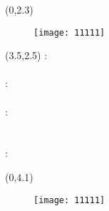 \documentclass[14pt,a4paper]{report}  %
\begin{document}
	{\begin{textblock}{6}(0,2.3)
	\begin{figure}
	\texttt{[image: 11111]}  %
    \end{figure}
    \end{textblock}}
    {\renewcommand\baselinestretch{0.99}
    \selectfont %
    {\begin{textblock}{15}(3.5,2.5) %
\noindent\fontsize{14pt}{0em}\selectfont {}\enspace:\enspace
\fontsize{14pt}{0em}\selectfont {}\\ 
\hspace*{\fill} \\
\fontsize{14pt}{0em}\selectfont {}\enspace:\enspace
\noindent\fontsize{14pt}{0em}\selectfont {} \\ 
\hspace*{\fill} \\
\fontsize{14pt}{0em}\selectfont {}\enspace:\enspace
\fontsize{14pt}{0em}\selectfont {}\\
\fontsize{14pt}{0em}\selectfont \makebox[5em][s]{\quad}\enspace\enspace
\fontsize{14pt}{0em}\selectfont {}\\
\hspace*{\fill} \\
\fontsize{14pt}{0em}\selectfont {}\enspace:\enspace
    \end{textblock}}}
    \vspace{2em}
    {\begin{textblock}{6}(0,4.1)
    \begin{figure}
        \texttt{[image: 11111]} %
    \end{figure}
    \end{textblock}}
\end{document}
